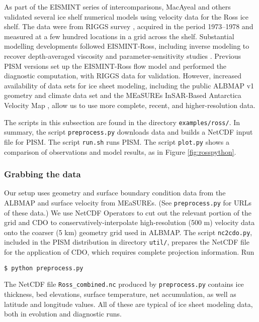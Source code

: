 As part of the EISMINT series of intercomparisons, MacAyeal and others \cite{MacAyealetal} validated several ice shelf numerical models using velocity data for the Ross ice shelf.  The data were from RIGGS survey \cite{RIGGS2}, acquired in the period 1973--1978 and measured at a few hundred locations in a grid across the shelf.  Substantial modelling developments followed EISMINT-Ross, including inverse modeling to recover depth-averaged viscosity \cite{RommelaereMacAyeal} and parameter-sensitivity studies \cite{HumbertGreveHutter}.  Previous PISM versions set up the EISMINT-Ross flow model and performed the diagnostic computation, with RIGGS data for validation.  However, increased availability of data sets for ice sheet modeling, including the public ALBMAP v1 \cite{LeBrocqetal2010} geometry and climate data set and the MEaSUREs InSAR-Based Antarctica Velocity Map \cite{Rignotetal2011}, allow us to use more complete, recent, and higher-resolution data.

The scripts in this subsection are found in the directory \texttt{examples/ross/}.  In summary, the script \texttt{preprocess.py} downloads data and builds a NetCDF input file for PISM.  The script \texttt{run.sh} runs PISM.  The script \texttt{plot.py} shows a comparison of observations and model results, as in Figure \ref{fig:rosspython}.


\subsubsection*{Grabbing the data}

Our setup uses geometry and surface boundary condition data from the ALBMAP and surface velocity from MEaSUREs.  (See \texttt{preprocess.py} for URLs of these data.)  We use NetCDF Operators to cut out the relevant portion of the grid and CDO to conservatively-interpolate high-resolution (500 m) velocity data onto the coarser (5 km) geometry grid used in ALBMAP.  The script \texttt{nc2cdo.py}, included in the PISM distribution in directory \texttt{util/}, prepares the NetCDF file for the application of CDO, which requires complete projection information.  Run

\begin{verbatim}
$ python preprocess.py
\end{verbatim}%

The NetCDF file \texttt{Ross_combined.nc} produced by \texttt{preprocess.py} contains ice thickness, bed elevations, surface temperature, net accumulation, as well as latitude and longitude values.  All of these are typical of ice sheet modeling data, both in evolution and diagnostic runs.


